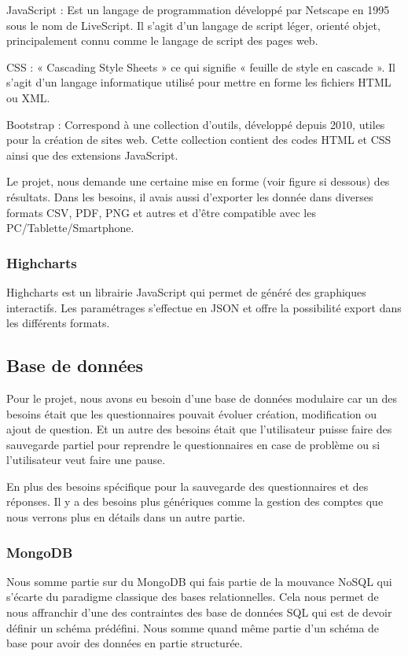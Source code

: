 JavaScript : Est un langage de programmation développé par Netscape en 1995 sous le nom de LiveScript. Il s'agit d'un langage de script léger, orienté objet, principalement connu comme le langage de script des pages web. \

CSS : « Cascading Style Sheets » ce qui signifie « feuille de style en cascade ». 
Il s'agit d'un langage informatique utilisé pour mettre en forme les fichiers HTML ou XML. \

Bootstrap : Correspond à une collection d'outils, développé depuis 2010, utiles pour la création de sites web. Cette collection contient des codes HTML et CSS ainsi que des extensions JavaScript.


Le projet, nous demande une certaine mise en forme (voir figure si dessous) des résultats. Dans les besoins, il avais aussi d'exporter les donnée dans diverses formats CSV, PDF, PNG et autres et d'être compatible avec les PC/Tablette/Smartphone.  

\subsubsection{Highcharts}

Highcharts est un librairie JavaScript qui permet de généré des graphiques interactifs. Les paramétrages s'effectue en JSON et offre la possibilité export dans les différents formats.

\subsection{Base de données}

Pour le projet, nous avons eu besoin d'une base de données modulaire car un des besoins était que les questionnaires pouvait évoluer création, modification ou ajout de question. Et un autre des besoins était que l'utilisateur puisse faire des sauvegarde partiel pour reprendre le questionnaires en case de problème ou si l'utilisateur veut faire une pause. 

En plus des besoins spécifique pour la sauvegarde des questionnaires et des réponses. Il y a des besoins plus génériques comme la gestion des comptes que nous verrons plus en détails dans un autre partie.

\subsubsection{MongoDB}

Nous somme partie sur du MongoDB qui fais partie de la mouvance NoSQL qui s'écarte du paradigme classique des bases relationnelles. Cela nous permet de nous affranchir d'une des contraintes des base de données SQL qui est de devoir définir un schéma prédéfini. Nous somme quand même partie d'un schéma de base pour avoir des données en partie structurée.

